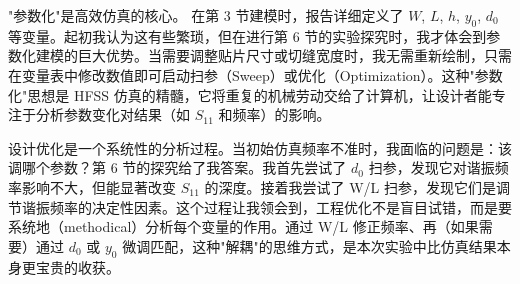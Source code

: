 \documentclass[12pt,a4paper,UTF8]{article}
\begin{document}
{\heiti "参数化"是高效仿真的核心。}{ 在第 3 节建模时，报告详细定义了 $W$, $L$, $h$, $y_0$, $d_0$ 等变量。}起初我认为这有些繁琐，但在进行第 6 节的实验探究时，我才体会到参数化建模的巨大优势。当需要调整贴片尺寸或切缝宽度时，我无需重新绘制，只需在变量表中修改数值即可启动扫参（Sweep）或优化（Optimization）。这种"参数化"思想是 HFSS 仿真的精髓，它将重复的机械劳动交给了计算机，让设计者能专注于分析参数变化对结果（如 $S_{11}$ 和频率）的影响。

{\heiti 设计优化是一个系统性的分析过程。}{当初始仿真频率不准时，我面临的问题是：该调哪个参数？}第 6 节的探究给了我答案。我首先尝试了 $d_0$ 扫参，发现它对谐振频率影响不大，但能显著改变 $S_{11}$ 的深度。接着我尝试了 W/L 扫参，发现它们是调节谐振频率的决定性因素。这个过程让我领会到，工程优化不是盲目试错，而是要系统地（methodical）分析每个变量的作用。通过 W/L 修正频率、再（如果需要）通过 $d_0$ 或 $y_0$ 微调匹配，这种"解耦"的思维方式，是本次实验中比仿真结果本身更宝贵的收获。
\end{document}
